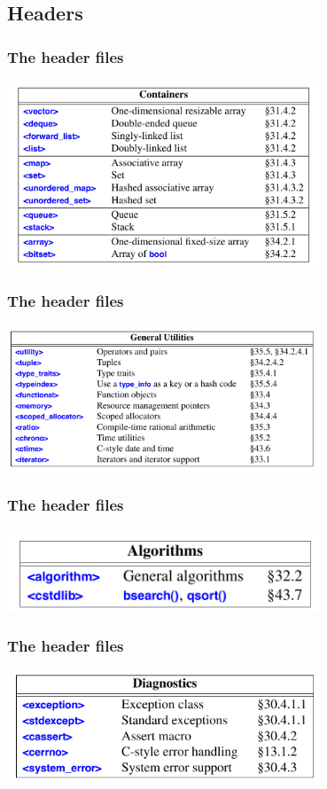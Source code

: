 \subsection{Headers}
\begin{frame}
  \frametitle{The header files}
  \centering
  \includegraphics[width=0.7\textwidth]{img/head_01.png}
\end{frame}
\begin{frame}
  \frametitle{The header files}
  \centering
  \includegraphics[width=0.7\textwidth]{img/head_02.png}
\end{frame}
\begin{frame}
  \frametitle{The header files}
  \centering
  \includegraphics[width=0.7\textwidth]{img/head_03.png}
\end{frame}
\begin{frame}
  \frametitle{The header files}
  \centering
  \includegraphics[width=0.7\textwidth]{img/head_04.png}
\end{frame}

